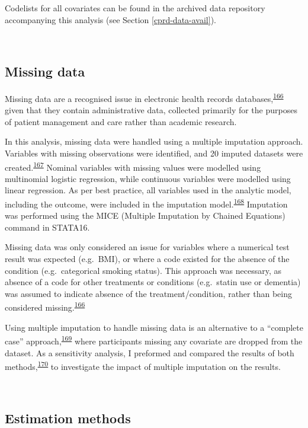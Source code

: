 \documentclass[a4paper, twoside]{templates/ociamthesis}
\begin{document}
Codelists for all covariates can be found in the archived data repository accompanying this analysis (see Section \ref{cprd-data-avail}).

~

\hypertarget{missing-data}{%
\subsection{Missing data}\label{missing-data}}

Missing data are a recognised issue in electronic health records databases,\textsuperscript{\protect\hyperlink{ref-wells2013strategies}{166}} given that they contain administrative data, collected primarily for the purposes of patient management and care rather than academic research.

In this analysis, missing data were handled using a multiple imputation approach. Variables with missing observations were identified, and 20 imputed datasets were created.\textsuperscript{\protect\hyperlink{ref-sterne2009}{167}} Nominal variables with missing values were modelled using multinomial logistic regression, while continuous variables were modelled using linear regression. As per best practice, all variables used in the analytic model, including the outcome, were included in the imputation model.\textsuperscript{\protect\hyperlink{ref-moons2006using}{168}} Imputation was performed using the MICE (Multiple Imputation by Chained Equations) command in STATA16.

Missing data was only considered an issue for variables where a numerical test result was expected (e.g.~BMI), or where a code existed for the absence of the condition (e.g.~categorical smoking status). This approach was necessary, as absence of a code for other treatments or conditions (e.g.~statin use or dementia) was assumed to indicate absence of the treatment/condition, rather than being considered missing.\textsuperscript{\protect\hyperlink{ref-wells2013strategies}{166}}

Using multiple imputation to handle missing data is an alternative to a ``complete case'' approach,\textsuperscript{\protect\hyperlink{ref-pigott2001review}{169}} where participants missing any covariate are dropped from the dataset. As a sensitivity analysis, I preformed and compared the results of both methods,\textsuperscript{\protect\hyperlink{ref-hughes2019}{170}} to investigate the impact of multiple imputation on the results.

~

\hypertarget{estimation-methods}{%
\subsection{Estimation methods}\label{estimation-methods}}
\end{document}
